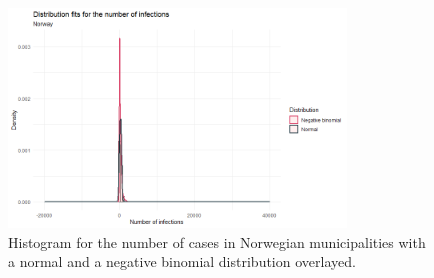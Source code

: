 \begin{figure}[H]
  \centering
  \includegraphics[width = 0.8\textwidth]{distrfit_norway_ts.png}
  \caption{Histogram for the number of cases in Norwegian municipalities with a normal and a negative binomial distribution overlayed.}
  \label{fitDistrNorway_ts}
\end{figure}
